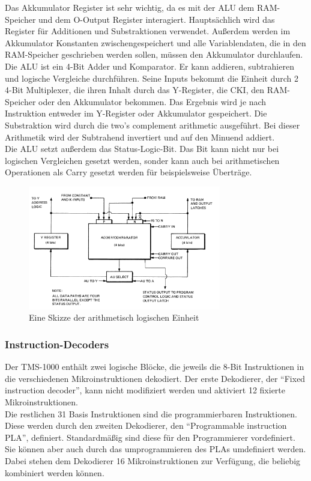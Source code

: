 Das Akkumulator Register ist sehr wichtig, da es mit der ALU dem RAM-Speicher und dem O-Output Register interagiert. Haupts{\"a}chlich wird das Register f{\"u}r Additionen und Substraktionen verwendet. Au{\ss}erdem werden im Akkumulator Konstanten zwischengespeichert und alle Variablendaten, die in den RAM-Speicher geschrieben werden sollen, m{\"u}ssen den Akkumulator durchlaufen. \\
Die ALU ist ein 4-Bit Adder und Komparator. Er kann addieren, subtrahieren und logische Vergleiche durchf{\"u}hren. Seine Inputs bekommt die Einheit durch 2 4-Bit Multiplexer, die ihren Inhalt durch das Y-Register, die CKI, den RAM-Speicher oder den Akkumulator bekommen. Das Ergebnis wird je nach Instruktion entweder im Y-Register oder Akkumulator gespeichert. Die Substraktion wird durch die two's complement arithmetic ausgef{\"u}hrt. Bei dieser Arithmetik wird der Subtrahend invertiert und auf den Minuend addiert. \\
Die ALU setzt au{\ss}erdem das Status-Logic-Bit. Das Bit kann nicht nur bei logischen Vergleichen gesetzt werden, sonder kann auch bei arithmetischen Operationen als Carry gesetzt werden f{\"u}r beispielsweise {\"U}bertr{\"a}ge.
\newpage

\begin{figure}[!htb]
	\centering
		\includegraphics[width=0.75\textwidth]{figures/ALU_TMS1000.PNG}
	\caption{Eine Skizze der arithmetisch logischen Einheit}
	\label{fig:ALU_TMS1000}
\end{figure}

\subsubsection{Instruction-Decoders}

Der TMS-1000 enth{\"a}lt zwei logische Bl{\"o}cke, die jeweils die 8-Bit Instruktionen in die verschiedenen Mikroinstruktionen dekodiert. Der erste Dekodierer, der "`Fixed instruction decoder"', kann nicht modifiziert werden und aktiviert 12 fixierte Mikroinstruktionen. \\
Die restlichen 31 Basis Instruktionen sind die programmierbaren Instruktionen. Diese werden durch den zweiten Dekodierer, den "`Programmable instruction PLA"', definiert. Standardm{\"a}{\ss}ig sind diese f{\"u}r den Programmierer vordefiniert. Sie k{\"o}nnen aber auch durch das umprogrammieren des PLAs umdefiniert werden. Dabei stehen dem Dekodierer 16 Mikroinstruktionen zur Verf{\"u}gung, die beliebig kombiniert werden k{\"o}nnen.

